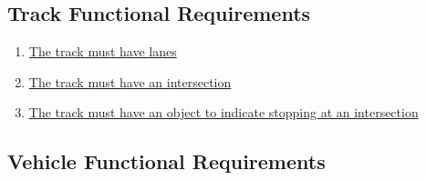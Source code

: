 \documentclass [11pt]{article}
\begin{document}



\subsection{Track Functional Requirements}
\begin{enumerate}[label=\textbf{T\arabic*:}, ref=T\arabic*, leftmargin =0.8in]
	\item \label{T1} \hyperref[sec:changeL]{The track must have lanes } %
	\item \label{T2} \hyperref[sec:changeL]{The track must have an intersection} %
	\item \label {T3} \hyperref[sec:changeL]{The track must have an object to indicate stopping at an intersection}  %
\end{enumerate}





\subsection{Vehicle Functional Requirements}
\end{document}
